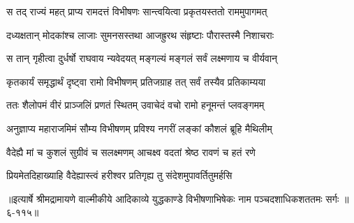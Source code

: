 \twolineshloka
{स तद् राज्यं महत् प्राप्य रामदत्तं विभीषणः}
{सान्त्वयित्वा प्रकृतयस्ततो राममुपागमत्} %

\twolineshloka
{दध्यक्षतान् मोदकांश्च लाजाः सुमनसस्तथा}
{आजह्रुरथ संहृष्टाः पौरास्तस्मै निशाचराः} %

\twolineshloka
{स तान् गृहीत्वा दुर्धर्षो राघवाय न्यवेदयत्}
{मङ्गल्यं मङ्गलं सर्वं लक्ष्मणाय च वीर्यवान्} %

\twolineshloka
{कृतकार्यं समृद्धार्थं दृष्ट्वा रामो विभीषणम्}
{प्रतिजग्राह तत् सर्वं तस्यैव प्रतिकाम्यया} %

\twolineshloka
{ततः शैलोपमं वीरं प्राञ्जलिं प्रणतं स्थितम्}
{उवाचेदं वचो रामो हनूमन्तं प्लवङ्गमम्} %

\twolineshloka
{अनुज्ञाप्य महाराजमिमं सौम्य विभीषणम्}
{प्रविश्य नगरीं लङ्कां कौशलं ब्रूहि मैथिलीम्} %

\twolineshloka
{वैदेह्यै मां च कुशलं सुग्रीवं च सलक्ष्मणम्}
{आचक्ष्व वदतां श्रेष्ठ रावणं च हतं रणे} %

\twolineshloka
{प्रियमेतदिहाख्याहि वैदेह्यास्त्वं हरीश्वर}
{प्रतिगृह्य तु संदेशमुपावर्तितुमर्हसि} %


॥इत्यार्षे श्रीमद्रामायणे वाल्मीकीये आदिकाव्ये युद्धकाण्डे विभीषणाभिषेकः नाम पञ्चदशाधिकशततमः सर्गः ॥६-११५॥
